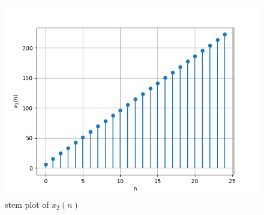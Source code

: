 \documentclass[a4,12pt,onecolumn]{IEEEtran}
\begin{document}
\begin{figure}[h!]
	\centering
	\includegraphics[width=\columnwidth]{ ncert-maths/11/9/2/9/figs/fig2.png}
	
	\caption{\large{stem plot of $x_2(n)$}}
\end{figure}
\end{document}
